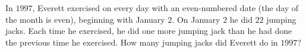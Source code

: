 In $1997$, Everett exercised on every day with an even-numbered date (the day of the month is even), beginning with January $2$. On January $2$ he did $22$ jumping jacks. Each time he exercised, he did one more jumping jack than he had done the previous time he exercised. How many jumping jacks did Everett do in $1997$?

